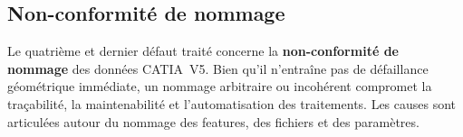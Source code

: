 \subsection{Non-conformité de nommage}
\label{subsec:arbre-nommage}

Le quatrième et dernier défaut traité concerne la \textbf{non-conformité de nommage} des données CATIA~V5. Bien qu'il n'entraîne pas de défaillance géométrique immédiate, un nommage arbitraire ou incohérent compromet la traçabilité, la maintenabilité et l'automatisation des traitements. Les causes sont articulées autour du nommage des features, des fichiers et des paramètres.


